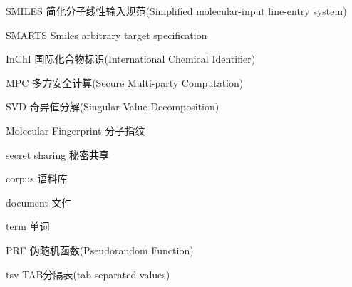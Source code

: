 \begin{denotation}[3cm]
\item[SMILES] 简化分子线性输入规范(Simplified molecular-input line-entry system)
\item[SMARTS] Smiles arbitrary target specification
\item[InChI] 国际化合物标识(International Chemical Identifier)
\item[MPC] 多方安全计算(Secure Multi-party Computation)
\item[SVD] 奇异值分解(Singular Value Decomposition)
\item[Molecular Fingerprint] 分子指纹
\item[secret sharing] 秘密共享
\item[corpus] 语料库
\item[document] 文件
\item[term] 单词
\item[PRF] 伪随机函数(Pseudorandom Function)
\item[tsv] TAB分隔表(tab-separated values)

\end{denotation}
